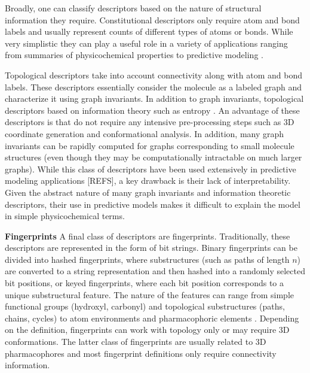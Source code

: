 \documentclass[letterpaper, 12pt]{article}
\begin{document}
Broadly, one can classify descriptors based on the nature of
structural information they require. Constitutional descriptors only
require atom and bond labels and usually represent counts of different
types of atoms or bonds. While very simplistic they can play a useful
role in a variety of applications ranging from summaries of
physicochemical properties to predictive modeling
\cite{Bender:2005aa}.  


Topological descriptors take into account connectivity along with atom
and bond labels. These descriptors essentially consider the molecule
as a labeled graph and characterize it using graph invariants. In
addition to graph invariants, topological descriptors based on
information theory such as entropy \cite{Dehmer:2009uq}. An advantage
of these descriptors is that do not require any intensive
pre-processing steps such as 3D coordinate generation and
conformational analysis. In addition, many graph invariants can be
rapidly computed for graphs corresponding to small molecule structures
(even though they may be computationally intractable on much larger
graphs). While this class of descriptors have been used extensively in
predictive modeling applications [REFS], a key drawback is their lack
of interpretability. Given the abstract nature of many graph
invariants and information theoretic descriptors, their use in
predictive models makes it difficult to explain the model in simple
physicochemical terms.


\textbf{Fingerprints} A final class of descriptors are
fingerprints. Traditionally, these descriptors are represented in the
form of bit strings. Binary fingerprints can be divided into hashed
fingerprints, where substructures (such as paths of length $n$) are
converted to a string representation and then hashed into a randomly
selected bit positions, or keyed fingerprints, where each bit position
corresponds to a unique substructural feature. The nature of the
features can range from simple functional groups (hydroxyl, carbonyl)
and topological substructures (paths, chains, cycles) to atom
environments \cite{Bremser1978,Bender:2004aa} and pharmacophoric
elements \cite{Renner:2006aa}. Depending on the definition,
fingerprints can work with topology only or may require 3D
conformations. The latter class of fingerprints are usually related to
3D pharmacophores and most fingerprint definitions only require
connectivity information.
\end{document}
